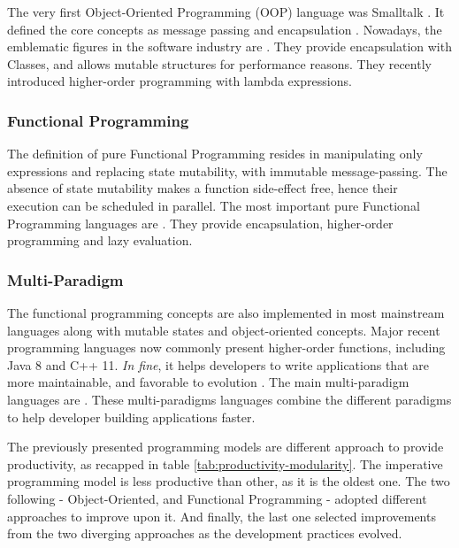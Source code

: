 
The very first Object-Oriented Programming (OOP) language was Small\-talk \cite{Goldberg1984}.
It defined the core concepts as message passing and encapsulation %
.
Nowadays, the emblematic figures in the software industry are .
They provide encapsulation with Classes, and allows mutable structures for performance reasons.
They recently introduced higher-order programming with lambda expressions.

\subsubsection{Functional Programming} \label{chapter3:software-productivity:programming-models:functional-programming}


The definition of pure Functional Programming resides in manipulating only expressions and replacing state mutability, with immutable message-passing.
The absence of state mutability makes a function side-effect free, hence their execution can be scheduled in parallel.
The most important pure Functional Programming languages are .
They provide encapsulation, higher-order programming and lazy evaluation.

\subsubsection{Multi-Paradigm}

The functional programming concepts are also implemented in most mainstream languages along with mutable states and object-oriented concepts.
Major recent programming languages now commonly present higher-order functions, including Java 8 and C++ 11.
\textit{In fine}, it helps developers to write applications that are more maintainable, and favorable to evolution \cite{Hughes1989,Turner1981}.
The main multi-paradigm languages are .
These multi-paradigms languages combine the different paradigms to help developer building applications faster.

\separator

The previously presented programming models are different approach to provide productivity, as recapped in table \ref{tab:productivity-modularity}.
The imperative programming model is less productive than other, as it is the oldest one.
The two following - Object-Oriented, and Functional Programming - adopted different approaches to improve upon it.
And finally, the last one selected improvements from the two diverging approaches as the development practices evolved.

